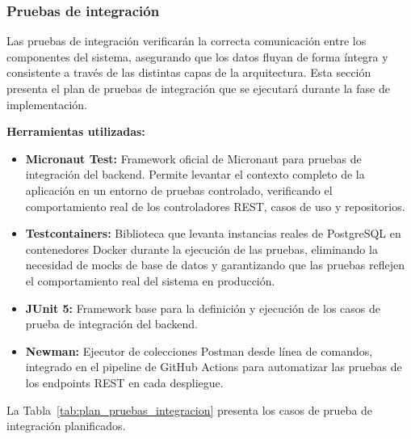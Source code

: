 \newpage
\subsubsection{Pruebas de integración}

Las pruebas de integración verificarán la correcta comunicación entre
los componentes del sistema, asegurando que los datos fluyan de forma
íntegra y consistente a través de las distintas capas de la
arquitectura. Esta sección presenta el plan de pruebas de integración
que se ejecutará durante la fase de implementación.

\textbf{Herramientas utilizadas:}

\begin{itemize}
    \item \textbf{Micronaut Test:} Framework oficial de Micronaut para
    pruebas de integración del backend. Permite levantar el contexto
    completo de la aplicación en un entorno de pruebas controlado,
    verificando el comportamiento real de los controladores REST,
    casos de uso y repositorios.
    \item \textbf{Testcontainers:} Biblioteca que levanta instancias
    reales de PostgreSQL en contenedores Docker durante la ejecución
    de las pruebas, eliminando la necesidad de mocks de base de datos
    y garantizando que las pruebas reflejen el comportamiento real del
    sistema en producción.
    \item \textbf{JUnit 5:} Framework base para la definición y
    ejecución de los casos de prueba de integración del backend.
    \item \textbf{Newman:} Ejecutor de colecciones Postman desde línea
    de comandos, integrado en el pipeline de GitHub Actions para
    automatizar las pruebas de los endpoints REST en cada despliegue.
\end{itemize}

La Tabla~\ref{tab:plan_pruebas_integracion} presenta los casos de
prueba de integración planificados.


